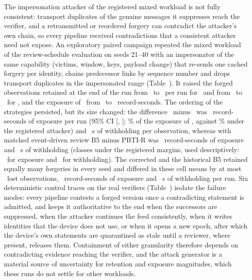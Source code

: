 The impersonation attacker of the registered mixed workload is not fully consistent: transport duplicates of the genuine messages it suppresses reach the verifier, and a retransmitted or reordered forgery can contradict the attacker's own chain, so every pipeline received contradictions that a consistent attacker need not expose. An exploratory paired campaign repeated the mixed workload of the review-schedule evaluation on seeds 21--40 with an impersonator of the same capability (victims, window, keys, payload change) that re-sends one cached forgery per identity, chains predecessor links by sequence number and drops transport duplicates in the impersonated range (Table~). It raised the forged observations retained at the end of the run from \YEfourRegPBTIOOne\ to \YEfourConPBTIOOne\ per run for \sys\ and from \YEfourRegBhistOOne\ to \YEfourConBhistOOne\ for \Bhist, and the exposure of \sys\ from \YEfourRegPBTINLX\ to \YEfourConPBTINLX\ record-seconds. The ordering of the strategies persisted, but its size changed: the difference \Bhist\ minus \sys\ was \YEfourConBhistvsPBTINLX\ record-seconds of exposure per run (95\% CI [\YEfourConBhistvsPBTINLXLo, \YEfourConBhistvsPBTINLXHi]; \YEfourConBhistvsPBTINLXPct\% of the exposure of \sys, against \YEfourRegBhistvsPBTINLXPct\% under the registered attacker) and \YEfourConBhistvsPBTIW~s of withholding per observation, whereas with matched event-driven review B5 minus PBTI-R was \YEfourConBevvsRevNLX\ record-seconds of exposure and \YEfourConBevvsRevW~s of withholding (classes under the registered margins, used descriptively: \YEfourConBevvsRevNLXClass\ for exposure and \YEfourConBevvsRevWClass\ for withholding). The corrected and the historical B5 retained equally many forgeries in every seed and differed in these cell means by at most \YEfourHistCorrMaxOTwo\ lost observations, \YEfourHistCorrMaxNLX\ record-seconds of exposure and \YEfourHistCorrMaxW~s of withholding per run. Six deterministic control traces on the real verifiers (Table~) isolate the failure modes: every pipeline contests a forged version once a contradicting statement is admitted, and keeps it authoritative to the end when the successors are suppressed, when the attacker continues the feed consistently, when it writes identities that the device does not use, or when it opens a new epoch, after which the device's own statements are quarantined as stale until a reviewer, where present, releases them. Containment of either granularity therefore depends on contradicting evidence reaching the verifier, and the attack generator is a material source of uncertainty for retention and exposure magnitudes, which these runs do not settle for other workloads.

